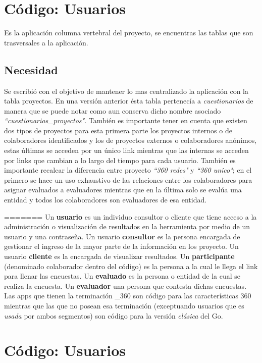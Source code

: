 \documentclass[10pt,a4paper]{book}
\begin{document}
	\chapter{Código: Usuarios}

	Es la aplicación columna vertebral del proyecto, se encuentras las tablas que son trasversales a la aplicación.

	\section{Necesidad}

	Se escribió con el objetivo de mantener lo mas centralizado la aplicación con la tabla proyectos. En una versión anterior ésta tabla pertenecía a \textit{cuestionarios} de manera que se puede notar como aun conserva dicho nombre asociado \textit{``cuestionarios\_proyectos"}. También es importante tener en cuenta que existen dos tipos de proyectos para esta primera parte los proyectos internos o de colaboradores identificados y los de proyectos externos o colaboradores anónimos, estas últimas se acceden por un único link mientras que las internas se acceden por links que cambian a lo largo del tiempo para cada usuario. También es importante recalcar la diferencia entre proyecto \textit{``360 redes"} y \textit{``360 unico"}; en el primero se hace un uso exhaustivo de las relaciones entre los colaboradores para asignar evaluados a evaluadores mientras que en la última solo se evalúa una entidad y todos los colaboradores son evaluadores de esa entidad.

=======
	Un \textbf{usuario} es un individuo consultor o cliente que tiene acceso a la administración o visualización de resultados en la herramienta por medio de un usuario y una contraseña. Un usuario \textbf{consultor} es la persona encargada de gestionar el ingreso de la mayor parte de la información en los proyecto. Un usuario \textbf{cliente} es la encargada de visualizar resultados. Un \textbf{participante} (denominado colaborador dentro del código) es la persona a la cual le llega el link para llenar las encuestas. Un \textbf{evaluado} es la persona o entidad de la cual se realiza la encuesta. Un \textbf{evaluador} una persona que contesta dichas encuestas. Las apps que tienen la terminación \_360 son código para las características 360 mientras que las que no posean esa terminación (exceptuando usuarios que es \textit{usada} por ambos segmentos) son código para la versión \textit{clásica} del Go.
	
	\chapter{Código: Usuarios}
		
\end{document}

